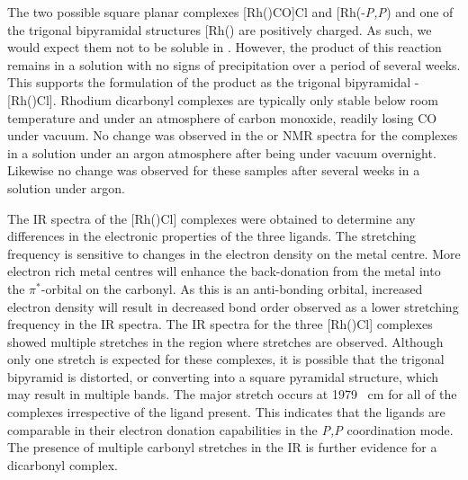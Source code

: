 The two possible square planar complexes [Rh(\tBuxantphosk)CO]Cl and [Rh(\tBuxantphos-\dento{}\emph{P,P}\textprime)\ce{(CO)2]Cl} and one of the trigonal bipyramidal structures [Rh(\tBuxantphosk)\ce{(CO)2]Cl} are positively charged.  As such, we would expect them not to be soluble in .  However, the product of this reaction remains in a  solution with no signs of precipitation over a period of several weeks.  This supports the formulation of the product as the trigonal bipyramidal \trans-[Rh(\tBuxantphos)Cl].  Rhodium dicarbonyl complexes are typically only stable below room temperature and under an atmosphere of carbon monoxide, readily losing CO under vacuum.\cite{Sanger1984, Sanger1985}  No change was observed in the \phosphorus{} or \proton{} NMR spectra for the complexes in a  solution under an argon atmosphere after being under vacuum overnight.  Likewise no change was observed for these samples after several weeks in a  solution under argon.  

The \gls{IR} spectra of the [Rh(\tBuxantphos)Cl] complexes were obtained to determine any differences in the electronic properties of the three ligands.  The  stretching frequency is sensitive to changes in the electron density on the metal centre.  More electron rich metal centres will enhance the back-donation from the metal into the $\pi^*$-orbital on the carbonyl.  As this is an anti-bonding orbital, increased electron density will result in decreased bond order observed as a lower  stretching frequency in the \gls{IR} spectra.  The \gls{IR} spectra for the three [Rh(\tBuxantphos)Cl] complexes showed multiple stretches in the region where  stretches are observed.  Although only one stretch is expected for these complexes, it is possible that the trigonal bipyramid is distorted, or converting into a square pyramidal structure,\cite{Sanger1985} which may result in multiple bands.  The major  stretch occurs at 1979 \si{\per\centi\metre} for all of the complexes irrespective of the \tBuxantphos{} ligand present.  This indicates that the ligands are comparable in their electron donation capabilities in the \dento{}\emph{P,P}\textprime{} coordination mode.  The presence of multiple carbonyl stretches in the \gls{IR} is further evidence for a dicarbonyl complex.  


